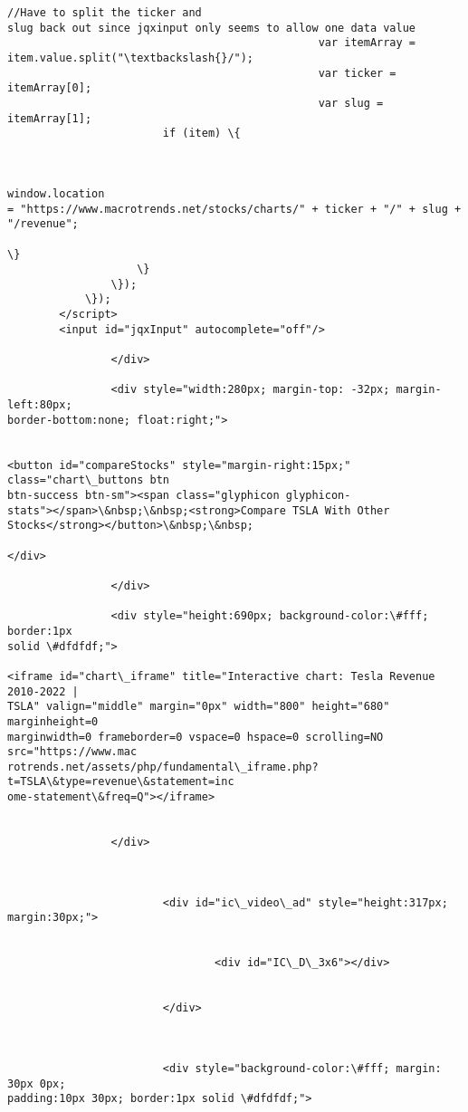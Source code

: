 \documentclass[11pt]{article}
\begin{document}
\begin{Verbatim}[commandchars=\\\{\}]
                                                //Have to split the ticker and
slug back out since jqxinput only seems to allow one data value
                                                var itemArray =
item.value.split("\textbackslash{}/");
                                                var ticker = itemArray[0];
                                                var slug = itemArray[1];
                        if (item) \{


                                                                window.location
= "https://www.macrotrends.net/stocks/charts/" + ticker + "/" + slug +
"/revenue";

\}
                    \}
                \});
            \});
        </script>
        <input id="jqxInput" autocomplete="off"/>

                </div>

                <div style="width:280px; margin-top: -32px; margin-left:80px;
border-bottom:none; float:right;">


<button id="compareStocks" style="margin-right:15px;" class="chart\_buttons btn
btn-success btn-sm"><span class="glyphicon glyphicon-
stats"></span>\&nbsp;\&nbsp;<strong>Compare TSLA With Other
Stocks</strong></button>\&nbsp;\&nbsp;

</div>

                </div>

                <div style="height:690px; background-color:\#fff; border:1px
solid \#dfdfdf;">

<iframe id="chart\_iframe" title="Interactive chart: Tesla Revenue 2010-2022 |
TSLA" valign="middle" margin="0px" width="800" height="680" marginheight=0
marginwidth=0 frameborder=0 vspace=0 hspace=0 scrolling=NO  src="https://www.mac
rotrends.net/assets/php/fundamental\_iframe.php?t=TSLA\&type=revenue\&statement=inc
ome-statement\&freq=Q"></iframe>


                </div>



                        <div id="ic\_video\_ad" style="height:317px;
margin:30px;">


                                <div id="IC\_D\_3x6"></div>


                        </div>



                        <div style="background-color:\#fff; margin: 30px 0px;
padding:10px 30px; border:1px solid \#dfdfdf;">



\end{Verbatim}
\end{document}

